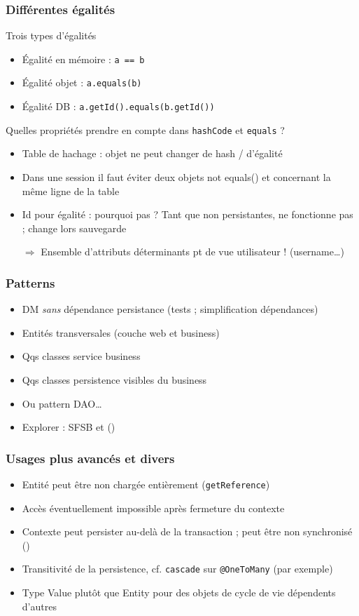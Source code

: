 \documentclass[english, french]{beamer}
\begin{document}
\begin{frame}
	\frametitle{Différentes égalités}
	\begin{block}{Trois types d’égalités}
		\begin{itemize}
			\item Égalité en mémoire : \texttt{a == b}
			\item Égalité objet : \texttt{a.equals(b)}
			\item Égalité DB : \texttt{a.getId().equals(b.getId())}
		\end{itemize}
	\end{block}
	Quelles propriétés prendre en compte dans \texttt{hashCode} et \texttt{equals} ?
	\begin{itemize}
		\item Table de hachage : objet ne peut changer de hash / d’égalité
		\item Dans une session il faut éviter deux objets not equals() et concernant la même ligne de la table
		\item Id pour égalité : pourquoi pas ? \pause Tant que non persistantes, ne fonctionne pas ; change lors sauvegarde \pause
		\item[$⇒$] Ensemble d’attributs déterminants pt de vue utilisateur ! (username…)
	\end{itemize}
\end{frame}

\begin{frame}
	\frametitle{Patterns}
	\begin{itemize}
		\item DM \emph{sans} dépendance persistance (tests ;  simplification dépendances)
		\item Entités transversales (couche web et business)
		\item Qqs classes service business
		\item Qqs classes persistence visibles du business
		\item Ou pattern DAO…
		\item Explorer : SFSB et ()
	\end{itemize}
\end{frame}

\begin{frame}
	\frametitle{Usages plus avancés et divers}
	\begin{itemize}
		\item Entité peut être non chargée entièrement (\texttt{getReference})
		\item Accès éventuellement impossible après fermeture du contexte
		\item Contexte peut persister au-delà de la transaction ; peut être non synchronisé ()
		\item Transitivité de la persistence, cf. \texttt{cascade} sur \texttt{@OneToMany} (par exemple)
		\item Type \og{}Value\fg{} plutôt que Entity pour des objets de cycle de vie dépendents d’autres
	\end{itemize}
	
\end{frame}
\end{document}
